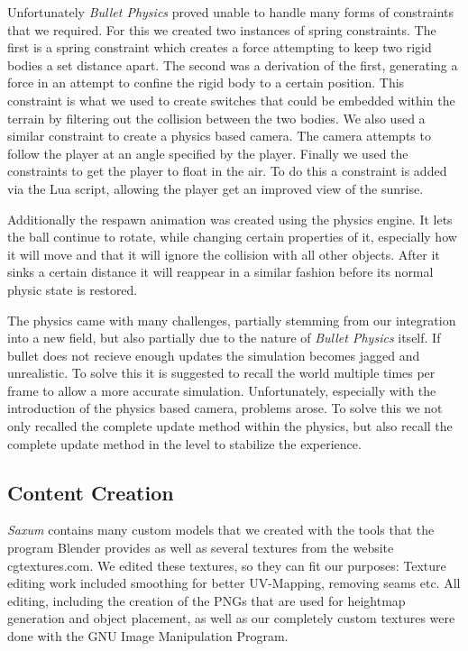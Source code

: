 \documentclass[sponsored]{acmsiggraph}
\begin{document}
Unfortunately \textit{Bullet Physics} proved unable to handle many forms of constraints that we required. For this we created two instances of spring constraints. The first is a spring constraint which creates a force attempting to keep two rigid bodies a set distance apart. The second was a derivation of the first, generating a force in an attempt to confine the rigid body to a certain position. This constraint is what we used to create switches that could be embedded within the terrain by filtering out the collision between the two bodies.
We also used a similar constraint to create a physics based camera. The camera attempts to follow the player at an angle specified by the player. Finally we used the constraints to get the player to float in the air. To do this a constraint is added via the Lua script, allowing the player get an improved view of the sunrise.

Additionally the respawn animation was created using the physics engine. It lets the ball continue to rotate, while changing certain properties of it, especially how it will move and that it will ignore the collision with all other objects. After it sinks a certain distance it will reappear in a similar fashion before its normal physic state is restored.

The physics came with many challenges, partially stemming from our integration into a new field, but also partially due to the nature of \textit{Bullet Physics} itself. If bullet does not recieve enough updates the simulation becomes jagged and unrealistic. To solve this it is suggested to recall the world multiple times per frame to allow a more accurate simulation. Unfortunately, especially with the introduction of the physics based camera, problems arose. To solve this we not only recalled the complete update method within the physics, but also recall the complete update method in the level to stabilize the experience.

\subsection{Content Creation}
\textit{Saxum} contains many custom models that we created with the tools that the program Blender provides as well as several textures from the website cgtextures.com. We edited these textures, so they can fit our purposes: Texture editing work included smoothing for better UV-Mapping, removing seams etc. All editing, including the creation of the PNGs that are used for heightmap generation and object placement, as well as our completely custom textures were done with the GNU Image Manipulation Program.
\end{document}
